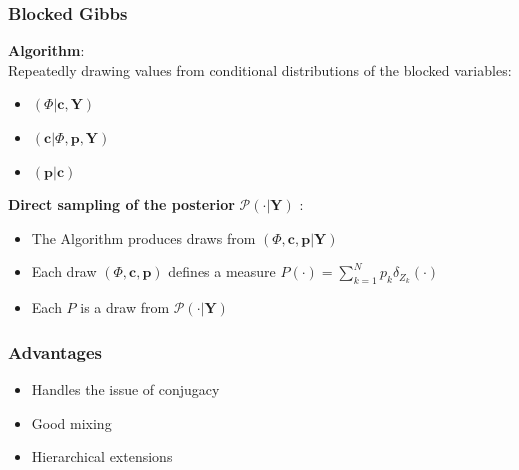 \documentclass{beamer}
\begin{document}
\begin{frame} %
	\frametitle{Blocked Gibbs}
\textbf{Algorithm}: \\
Repeatedly drawing values from conditional distributions of the blocked variables:\\

\begin{itemize}
    \item $(\Phi | \textbf{c}, \textbf{Y})$
    \item $(\textbf{c}| \Phi,\textbf{p}, \textbf{Y})$
    \item $(\textbf{p}| \textbf{c})$

\end{itemize}

\textbf{Direct sampling of the posterior} $\mathscr{P}(\cdot|\mathbf{Y})$ :\\

\begin{itemize}
    \item The Algorithm produces draws from $(\Phi,\textbf{c},\textbf{p}| \textbf{Y})$ \\
\item Each draw $(\Phi,\textbf{c},\textbf{p})$ defines a measure $P(\cdot)= \sum\limits_{k=1}^N  \mathit{p_{k}}\delta_{Z_{k}}(\cdot) $
\item Each $P$ is a draw from $\mathscr{P}(\cdot|\mathbf{Y})$
\end{itemize}




\end{frame}

\begin{frame} %
	\frametitle{Advantages}

	\begin{itemize}
	     \item Handles the issue of conjugacy

	    \item Good mixing %

	    \item Hierarchical extensions
	\end{itemize}

\end{frame}
\end{document}
